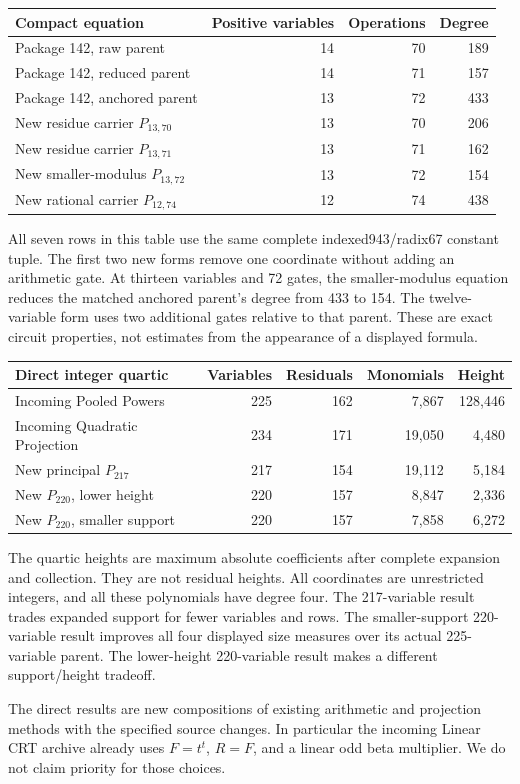 \begin{center}\small
\begin{tabular}{@{}lrrr@{}}
\toprule
Compact equation & Positive variables & Operations & Degree\\
\midrule
Package 142, raw parent &14&70&189\\
Package 142, reduced parent &14&71&157\\
Package 142, anchored parent &13&72&433\\
\midrule
New residue carrier $P_{13,70}$ &13&70&206\\
New residue carrier $P_{13,71}$ &13&71&162\\
New smaller-modulus $P_{13,72}$ &13&72&154\\
New rational carrier $P_{12,74}$ &12&74&438\\
\bottomrule
\end{tabular}
\end{center}
All seven rows in this table use the same complete indexed943/radix67
constant tuple. The first two new forms remove one coordinate without
adding an arithmetic gate. At thirteen variables and 72 gates, the
smaller-modulus equation reduces the matched anchored parent's degree
from 433 to 154. The twelve-variable form uses two additional gates
relative to that parent. These are exact circuit properties, not
estimates from the appearance of a displayed formula.

\begin{center}\small
\begin{tabular}{@{}lrrrr@{}}
\toprule
Direct integer quartic & Variables & Residuals & Monomials & Height\\
\midrule
Incoming Pooled Powers &225&162&7,867&128,446\\
Incoming Quadratic Projection &234&171&19,050&4,480\\
\midrule
New principal $P_{217}$ &217&154&19,112&5,184\\
New $P_{220}$, lower height &220&157&8,847&2,336\\
New $P_{220}$, smaller support &220&157&7,858&6,272\\
\bottomrule
\end{tabular}
\end{center}
The quartic heights are maximum absolute coefficients after complete
expansion and collection. They are not residual heights. All coordinates
are unrestricted integers, and all these polynomials have degree four.
The 217-variable result trades expanded support for fewer variables and
rows. The smaller-support 220-variable result improves all four displayed
size measures over its actual 225-variable parent. The lower-height
220-variable result makes a different support/height tradeoff.

The direct results are new compositions of existing arithmetic and
projection methods with the specified source changes. In particular the
incoming Linear CRT archive already uses $F=t^t$, $R=F$, and a linear
odd beta multiplier. We do not claim priority for those choices.

